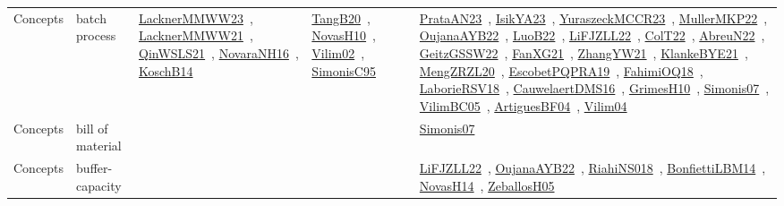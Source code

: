 {\begin{longtable}{lp{3cm}>{\raggedright\arraybackslash}p{6cm}>{\raggedright\arraybackslash}p{6cm}>{\raggedright\arraybackslash}p{8cm}}
Concepts & batch process & \href{articles/LacknerMMWW23.pdf}{LacknerMMWW23}~\cite{LacknerMMWW23}, \href{papers/LacknerMMWW21.pdf}{LacknerMMWW21}~\cite{LacknerMMWW21}, \href{articles/QinWSLS21.pdf}{QinWSLS21}~\cite{QinWSLS21}, \href{articles/NovaraNH16.pdf}{NovaraNH16}~\cite{NovaraNH16}, \href{papers/KoschB14.pdf}{KoschB14}~\cite{KoschB14} & \href{papers/TangB20.pdf}{TangB20}~\cite{TangB20}, \href{articles/NovasH10.pdf}{NovasH10}~\cite{NovasH10}, \href{papers/Vilim02.pdf}{Vilim02}~\cite{Vilim02}, \href{papers/SimonisC95.pdf}{SimonisC95}~\cite{SimonisC95} & \href{articles/PrataAN23.pdf}{PrataAN23}~\cite{PrataAN23}, \href{articles/IsikYA23.pdf}{IsikYA23}~\cite{IsikYA23}, \href{articles/YuraszeckMCCR23.pdf}{YuraszeckMCCR23}~\cite{YuraszeckMCCR23}, \href{articles/MullerMKP22.pdf}{MullerMKP22}~\cite{MullerMKP22}, \href{papers/OujanaAYB22.pdf}{OujanaAYB22}~\cite{OujanaAYB22}, \href{papers/LuoB22.pdf}{LuoB22}~\cite{LuoB22}, \href{papers/LiFJZLL22.pdf}{LiFJZLL22}~\cite{LiFJZLL22}, \href{articles/ColT22.pdf}{ColT22}~\cite{ColT22}, \href{articles/AbreuN22.pdf}{AbreuN22}~\cite{AbreuN22}, \href{papers/GeitzGSSW22.pdf}{GeitzGSSW22}~\cite{GeitzGSSW22}, \href{articles/FanXG21.pdf}{FanXG21}~\cite{FanXG21}, \href{articles/ZhangYW21.pdf}{ZhangYW21}~\cite{ZhangYW21}, \href{papers/KlankeBYE21.pdf}{KlankeBYE21}~\cite{KlankeBYE21}, \href{articles/MengZRZL20.pdf}{MengZRZL20}~\cite{MengZRZL20}, \href{articles/EscobetPQPRA19.pdf}{EscobetPQPRA19}~\cite{EscobetPQPRA19}, \href{articles/FahimiOQ18.pdf}{FahimiOQ18}~\cite{FahimiOQ18}, \href{articles/LaborieRSV18.pdf}{LaborieRSV18}~\cite{LaborieRSV18}, \href{papers/CauwelaertDMS16.pdf}{CauwelaertDMS16}~\cite{CauwelaertDMS16}, \href{papers/GrimesH10.pdf}{GrimesH10}~\cite{GrimesH10}, \href{articles/Simonis07.pdf}{Simonis07}~\cite{Simonis07}, \href{articles/VilimBC05.pdf}{VilimBC05}~\cite{VilimBC05}, \href{papers/ArtiguesBF04.pdf}{ArtiguesBF04}~\cite{ArtiguesBF04}, \href{papers/Vilim04.pdf}{Vilim04}~\cite{Vilim04}\\
Concepts & bill of material &  &  & \href{articles/Simonis07.pdf}{Simonis07}~\cite{Simonis07}\\
Concepts & buffer-capacity &  &  & \href{papers/LiFJZLL22.pdf}{LiFJZLL22}~\cite{LiFJZLL22}, \href{papers/OujanaAYB22.pdf}{OujanaAYB22}~\cite{OujanaAYB22}, \href{papers/RiahiNS018.pdf}{RiahiNS018}~\cite{RiahiNS018}, \href{articles/BonfiettiLBM14.pdf}{BonfiettiLBM14}~\cite{BonfiettiLBM14}, \href{articles/NovasH14.pdf}{NovasH14}~\cite{NovasH14}, \href{articles/ZeballosH05.pdf}{ZeballosH05}~\cite{ZeballosH05}\\

\end{longtable}}
